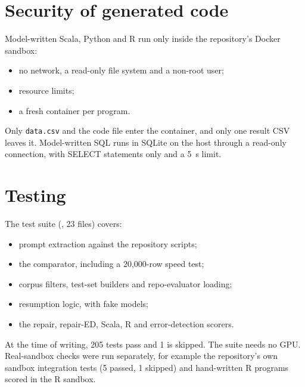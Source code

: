 \section{Security of generated code}

Model-written Scala, Python and R run only inside the repository's Docker sandbox:
\begin{itemize}
\item no network, a read-only file system and a non-root user;
\item resource limits;
\item a fresh container per program.
\end{itemize}
Only \texttt{data.csv} and the code file enter the container, and only one result CSV leaves it. Model-written SQL
runs in SQLite on the host through a read-only connection, with SELECT statements only and a 5~s limit.

\section{Testing}

The test suite (, 23 files) covers:
\begin{itemize}
\item prompt extraction against the repository scripts;
\item the comparator, including a 20,000-row speed test;
\item corpus filters, test-set builders and repo-evaluator loading;
\item resumption logic, with fake models;
\item the repair, repair-ED, Scala, R and error-detection scorers.
\end{itemize}
At the time of writing, 205 tests pass and 1 is skipped. The suite needs no GPU. Real-sandbox checks were run
separately, for example the repository's own sandbox integration tests (5 passed, 1 skipped) and hand-written R
programs scored in the R sandbox.
